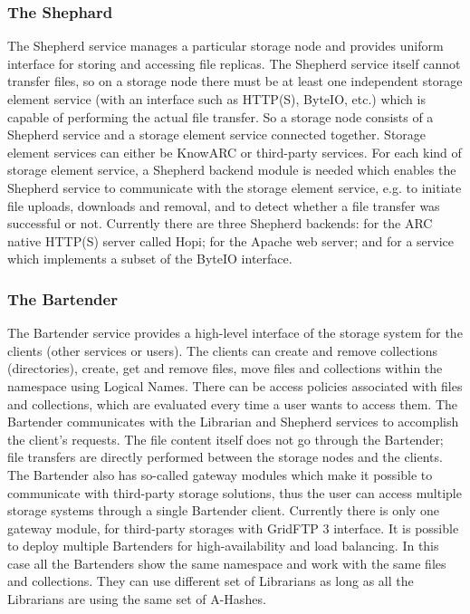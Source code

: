 \documentclass[preprint,12pt]{elsarticle}
\begin{document}
\subsubsection{The Shephard}
\label{sec:shephard}
The Shepherd service manages a particular storage node and provides
uniform interface for storing and accessing file replicas. The
Shepherd service itself cannot transfer files, so on a storage node
there must be at least one independent storage element service (with
an interface such as HTTP(S), ByteIO, etc.) which is capable of
performing the actual file transfer. So a storage node consists of a
Shepherd service and a storage element service connected
together. Storage element services can either be KnowARC or
third-party services. For each kind of storage element service, a
Shepherd backend module is needed which enables the Shepherd service
to communicate with the storage element service, e.g. to initiate file
uploads, downloads and removal, and to detect whether a file transfer
was successful or not. Currently there are three Shepherd backends:
for the ARC native HTTP(S) server called Hopi; for the Apache web
server; and for a service which implements a subset of the ByteIO
interface.

\subsubsection{The Bartender}
\label{sec:bartender}
The Bartender service provides a high-level interface of the storage
system for the clients (other services or users). The clients can
create and remove collections (directories), create, get and remove
files, move files and collections within the namespace using Logical
Names. There can be access policies associated with files and
collections, which are evaluated every time a user wants to access
them. The Bartender communicates with the Librarian and Shepherd
services to accomplish the client’s requests.  The file content
itself does not go through the Bartender; file transfers are directly
performed between the storage nodes and the clients. The Bartender
also has so-called gateway modules which make it possible to
communicate with third-party storage solutions, thus the user can
access multiple storage systems through a single Bartender
client. Currently there is only one gateway module, for third-party
storages with GridFTP 3 interface. It is possible to deploy multiple
Bartenders for high-availability and load balancing. In this case all
the Bartenders show the same namespace and work with the same files
and collections. They can use different set of Librarians as long as
all the Librarians are using the same set of A-Hashes.
\end{document}
